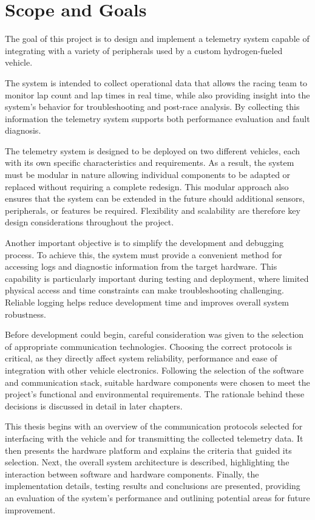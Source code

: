 \clearpage
\section{Scope and Goals}

The goal of this project is to design and implement a telemetry system capable of integrating with a variety of peripherals
used by a custom hydrogen-fueled vehicle.

The system is intended to collect operational data that allows the racing team to monitor lap count and lap times in real time,
while also providing insight into the system's behavior for troubleshooting and post-race analysis. By collecting this information
the telemetry system supports both performance evaluation and fault diagnosis.

The telemetry system is designed to be deployed on two different vehicles, each with its own specific
characteristics and requirements. As a result, the system must be modular in nature allowing individual
components to be adapted or replaced without requiring a complete redesign. This modular approach also
ensures that the system can be extended in the future should additional sensors, peripherals, or features be
required. Flexibility and scalability are therefore key design considerations throughout the project.

Another important objective is to simplify the development and debugging process. To achieve this, the
system must provide a convenient method for accessing logs and diagnostic information from the
target hardware. This capability is particularly important during testing and deployment, where limited
physical access and time constraints can make troubleshooting challenging. Reliable logging helps reduce
development time and improves overall system robustness.

Before development could begin, careful consideration was given to the selection of appropriate communication
technologies. Choosing the correct protocols is critical, as they directly affect system reliability, performance
and ease of integration with other vehicle electronics. Following the selection of the software and communication stack,
suitable hardware components were chosen to meet the project's functional and environmental requirements. The rationale
behind these decisions is discussed in detail in later chapters.

This thesis begins with an overview of the communication protocols selected for interfacing with the vehicle
and for transmitting the collected telemetry data. It then presents the hardware platform and explains the criteria
that guided its selection. Next, the overall system architecture is described, highlighting the interaction between
software and hardware components. Finally, the implementation details, testing results and conclusions are presented,
providing an evaluation of the system's performance and outlining potential areas for future improvement.